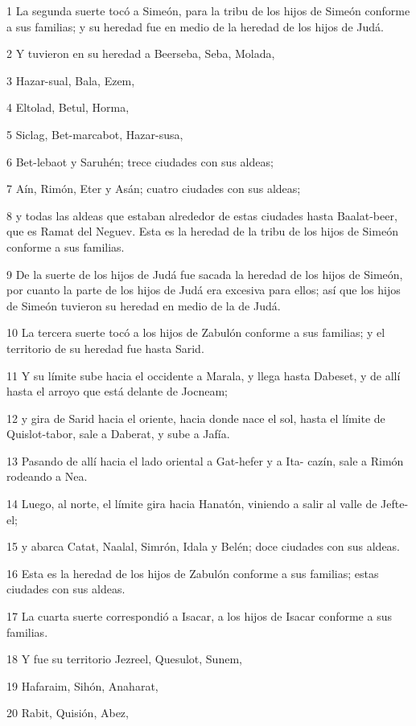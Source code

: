 \par 1 La segunda suerte tocó a Simeón, para la tribu de los hijos de Simeón conforme a sus familias; y su heredad fue en medio de la heredad de los hijos de Judá.
\par 2 Y tuvieron en su heredad a Beerseba, Seba, Molada,
\par 3 Hazar-sual, Bala, Ezem,
\par 4 Eltolad, Betul, Horma,
\par 5 Siclag, Bet-marcabot, Hazar-susa,
\par 6 Bet-lebaot y Saruhén; trece ciudades con sus aldeas;
\par 7 Aín, Rimón, Eter y Asán; cuatro ciudades con sus aldeas;
\par 8 y todas las aldeas que estaban alrededor de estas ciudades hasta Baalat-beer, que es Ramat del Neguev. Esta es la heredad de la tribu de los hijos de Simeón conforme a sus familias. 
\par 9 De la suerte de los hijos de Judá fue sacada la heredad de los hijos de Simeón, por cuanto la parte de los hijos de Judá era excesiva para ellos; así que los hijos de Simeón tuvieron su heredad en medio de la de Judá.
\par 10 La tercera suerte tocó a los hijos de Zabulón conforme a sus familias; y el territorio de su heredad fue hasta Sarid.
\par 11 Y su límite sube hacia el occidente a Marala, y llega hasta Dabeset, y de allí hasta el arroyo que está delante de Jocneam;
\par 12 y gira de Sarid hacia el oriente, hacia donde nace el sol, hasta el límite de Quislot-tabor, sale a Daberat, y sube a Jafía.
\par 13 Pasando de allí hacia el lado oriental a Gat-hefer y a Ita- cazín, sale a Rimón rodeando a Nea.
\par 14 Luego, al norte, el límite gira hacia Hanatón, viniendo a salir al valle de Jefte-el;
\par 15 y abarca Catat, Naalal, Simrón, Idala y Belén; doce ciudades con sus aldeas.
\par 16 Esta es la heredad de los hijos de Zabulón conforme a sus familias; estas ciudades con sus aldeas.
\par 17 La cuarta suerte correspondió a Isacar, a los hijos de Isacar conforme a sus familias.
\par 18 Y fue su territorio Jezreel, Quesulot, Sunem,
\par 19 Hafaraim, Sihón, Anaharat,
\par 20 Rabit, Quisión, Abez,
